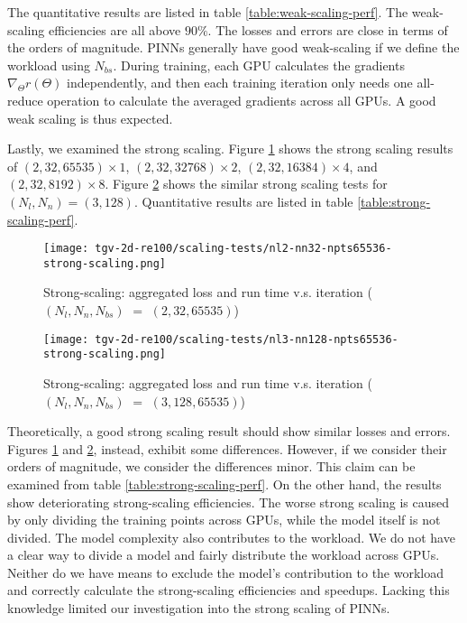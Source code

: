 

The quantitative results are listed in table \ref{table:weak-scaling-perf}.
The weak-scaling efficiencies are all above $90\%$.
The losses and errors are close in terms of the orders of magnitude.
PINNs generally have good weak-scaling if we define the workload using $N_{bs}$.
During training, each GPU calculates the gradients $\nabla_{\Theta} r(\Theta)$ independently, and then each training iteration only needs one all-reduce operation to calculate the averaged gradients across all GPUs.
A good weak scaling is thus expected.

Lastly, we examined the strong scaling.
Figure \ref{fig:nl2-nn32-npts65536-strong-scaling} shows the strong scaling results of $(2, 32, 65535)\times 1$, $(2, 32, 32768)\times 2$, $(2, 32, 16384)\times 4$, and $(2, 32, 8192)\times 8$.
Figure \ref{fig:nl3-nn128-npts65536-strong-scaling} shows the similar strong scaling tests for $(N_l, N_n)=(3, 128)$.
Quantitative results are listed in table \ref{table:strong-scaling-perf}. 

\begin{figure}[hbt!]
    \centering%
    \texttt{[image: tgv-2d-re100/scaling-tests/nl2-nn32-npts65536-strong-scaling.png]}
    \caption[%
        Strong-scaling: aggregated loss and run time v.s. iteration ($(N_l, N_n, N_{bs})$ $=$ $(2, 32, 65535)$)%
    ]{%
        Strong-scaling: aggregated loss and run time v.s. iteration ($(N_l, N_n, N_{bs})$ $=$ $(2, 32, 65535)$)%
    }\label{fig:nl2-nn32-npts65536-strong-scaling}
\end{figure}

\begin{figure}[hbt!]
    \centering%
    \texttt{[image: tgv-2d-re100/scaling-tests/nl3-nn128-npts65536-strong-scaling.png]}
    \caption[%
        Strong-scaling: aggregated loss and run time v.s. iteration ($(N_l, N_n, N_{bs})$ $=$ $(3, 128, 65535)$)%
    ]{%
        Strong-scaling: aggregated loss and run time v.s. iteration ($(N_l, N_n, N_{bs})$ $=$ $(3, 128, 65535)$)%
    }\label{fig:nl3-nn128-npts65536-strong-scaling}
\end{figure}

Theoretically, a good strong scaling result should show similar losses and errors.
Figures \ref{fig:nl2-nn32-npts65536-strong-scaling} and \ref{fig:nl3-nn128-npts65536-strong-scaling}, instead, exhibit some differences.
However, if we consider their orders of magnitude, we consider the differences minor.
This claim can be examined from table \ref{table:strong-scaling-perf}.
On the other hand, the results show deteriorating strong-scaling efficiencies.
The worse strong scaling is caused by only dividing the training points across GPUs, while the model itself is not divided.  
The model complexity also contributes to the workload.
We do not have a clear way to divide a model and fairly distribute the workload across GPUs.
Neither do we have means to exclude the model's contribution to the workload and correctly calculate the strong-scaling efficiencies and speedups.
Lacking this knowledge limited our investigation into the strong scaling of PINNs.


